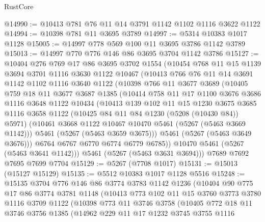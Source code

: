 \begin{lexlean}{RustCore}
\begin{coremodule}
@14990 := @10413 @781 @76 @11 @14 @3791 @1142 @1102 @1116 @3622 @1122
@14994 := @10398 @781 @11 @3695 @3789
@14997 := @5314 @10383 @1017 @1128
@15005 := @14997 @778 @569 @100 @11 @3695 @3786 @1142 @3789
@15013 := @14997 @770 @776 @146 @86 @3695 @3704 @1142 @3786
@15127 := @10404
    @276
    @769
    @17
    @86
    @3695
    @3702
    @1554
    (@10454
      @768
      @11
      @15
      @1139
      @3694
      @3701
      @1116
      @3630
      @1122
      @10467
      (@10413
        @766
        @76
        @11
        @14
        @3691
        @1142
        @1102
        @1116
        @3640
        @1122
        (@10398
          @766
          @11
          @3677
          @3689
          (@10405
            @759
            @18
            @11
            @3677
            @3687
            @1385
            (@10414
              @758
              @11
              @17
              @1100
              @3676
              @3686
              @1116
              @3648
              @1122
              @10434
              (@10413
                @139
                @102
                @11
                @15
                @1230
                @3675
                @3685
                @1116
                @3658
                @1122
                (@10425 @84 @11 @84 @1230 (@5208 (@10430 @84)) @5971)
                (@10461 @3668 @1122 @10467 @10470 @5461 (@5267 (@5463 @3669 @1142)))
                @5461
                (@5267 (@5463 @3659 @3675)))
              @5461
              (@5267 (@5463 @3649 @3676)))
            @6764
            @6767
            @6770
            @6774
            @6779
            @6785))
        @10470
        @5461
        (@5267 (@5463 @3641 @1142)))
      @5461
      (@5267 (@5463 @3631 @3694)))
    @7689
    @7692
    @7695
    @7699
    @7704
@15129 := @5267 (@7708 @1017)
@15131 := @15013 (@15127 @15129)
@15135 := @5512 @10383 @1017 @1128 @5516
@15248 := @15135
    @3704
    @776
    @146
    @86
    @3774
    @3783
    @1142
    @1236
    (@10404
      @90
      @775
      @17
      @86
      @3774
      @3781
      @1148
      (@10413
        @773
        @102
        @11
        @15
        @3760
        @3773
        @3780
        @1116
        @3709
        @1122
        (@10398
          @773
          @11
          @3746
          @3758
          (@10405
            @772
            @18
            @11
            @3746
            @3756
            @1385
            (@14962
              @229
              @11
              @17
              @1232
              @3745
              @3755
              @1116

\end{coremodule}
\end{lexlean}
